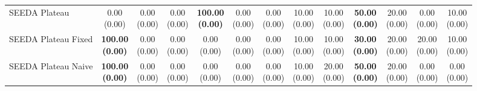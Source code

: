 \begin{table}[H]
{\begin{tabular}{l|cccccc|cccccc}
SEEDA Plateau & \makecell{0.00 \\ (0.00)} & \makecell{0.00 \\ (0.00)} & {\cellcolor[HTML]{C8E6C9}} \makecell{0.00 \\ (0.00)} & \bfseries \makecell{100.00 \\ (0.00)} & \makecell{0.00 \\ (0.00)} & \makecell{0.00 \\ (0.00)} & \makecell{10.00 \\ (0.00)} & \makecell{10.00 \\ (0.00)} & {\cellcolor[HTML]{C8E6C9}} \bfseries \makecell{50.00 \\ (0.00)} & \makecell{20.00 \\ (0.00)} & \makecell{0.00 \\ (0.00)} & \makecell{10.00 \\ (0.00)} \\
SEEDA Plateau Fixed & \bfseries \makecell{100.00 \\ (0.00)} & \makecell{0.00 \\ (0.00)} & {\cellcolor[HTML]{C8E6C9}} \makecell{0.00 \\ (0.00)} & \makecell{0.00 \\ (0.00)} & \makecell{0.00 \\ (0.00)} & \makecell{0.00 \\ (0.00)} & \makecell{10.00 \\ (0.00)} & \makecell{10.00 \\ (0.00)} & {\cellcolor[HTML]{C8E6C9}} \bfseries \makecell{30.00 \\ (0.00)} & \makecell{20.00 \\ (0.00)} & \makecell{20.00 \\ (0.00)} & \makecell{10.00 \\ (0.00)} \\
SEEDA Plateau Naive & \bfseries \makecell{100.00 \\ (0.00)} & \makecell{0.00 \\ (0.00)} & {\cellcolor[HTML]{C8E6C9}} \makecell{0.00 \\ (0.00)} & \makecell{0.00 \\ (0.00)} & \makecell{0.00 \\ (0.00)} & \makecell{0.00 \\ (0.00)} & \makecell{10.00 \\ (0.00)} & \makecell{20.00 \\ (0.00)} & {\cellcolor[HTML]{C8E6C9}} \bfseries \makecell{50.00 \\ (0.00)} & \makecell{20.00 \\ (0.00)} & \makecell{0.00 \\ (0.00)} & \makecell{0.00 \\ (0.00)} \\
\bottomrule
\end{tabular}
}%
\end{table}
